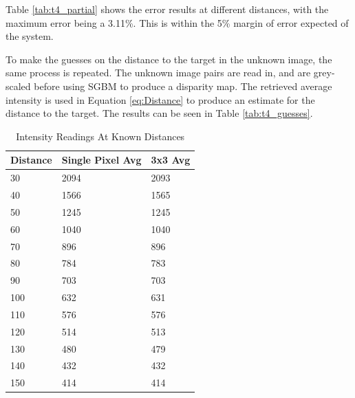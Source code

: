 \documentclass[conference]{IEEEtran}
\begin{document}
Table \ref{tab:t4_partial} shows the error results at different distances, with the maximum error being a 3.11\%. This is within the 5\% margin of error expected of the system.

To make the guesses on the distance to the target in the unknown image, the same process is repeated. The unknown image pairs are read in, and are grey-scaled before using SGBM to produce a disparity map. The retrieved average intensity is used in Equation \ref{eq:Distance} to produce an estimate for the distance to the target. The results can be seen in Table \ref{tab:t4_guesses}. 

\begin{table}[]
\caption{Intensity Readings At Known Distances}
\label{tab:intensity_results}
\begin{tabular}{|l|l|l|}
\hline
\textbf{Distance} & \textbf{Single Pixel Avg} & \textbf{3x3 Avg} \\ \hline
30                 & 2094 & 2093         \\ \hline
40                & 1566 & 1565         \\ \hline
50                 & 1245 & 1245         \\ \hline
60                 & 1040 & 1040         \\ \hline
70                 & 896 & 896         \\ \hline
80                & 784 & 783         \\ \hline
90                & 703 & 703         \\ \hline
100                 & 632 & 631          \\ \hline
110      & 576 & 576           \\ \hline
120      & 514 & 513         \\ \hline
130                 & 480 &479          \\ \hline
140				& 432	& 432	\\ \hline
150				&	414 & 414	\\ \hline
\end{tabular}
\end{table} 
\end{document}
